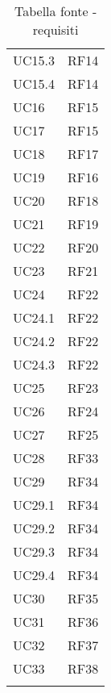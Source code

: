 {\begin{longtable}{C{.47\freewidth} C{.47\freewidth}}
      UC15.3 & RF14\\
      UC15.4 & RF14\\
      UC16 & RF15\\
      UC17 & RF15\\
      UC18 & RF17\\
      UC19 & RF16\\
      UC20 & RF18\\
      UC21 & RF19\\
      UC22 & RF20\\
      UC23 & RF21\\
      UC24 & RF22\\
      UC24.1 & RF22\\
      UC24.2 & RF22\\
      UC24.3 & RF22\\
      UC25 & RF23 \\
      UC26 & RF24 \\
      UC27 & RF25 \\
      UC28 & RF33 \\
      UC29 & RF34 \\
      UC29.1 & RF34 \\
      UC29.2 & RF34 \\
      UC29.3 & RF34 \\
      UC29.4 & RF34 \\
      UC30 & RF35 \\
      UC31 & RF36 \\
      UC32 & RF37\\
      UC33 & RF38\\
      \bottomrule
      \caption{Tabella fonte - requisiti}
      \end{longtable}
}
\newpage
